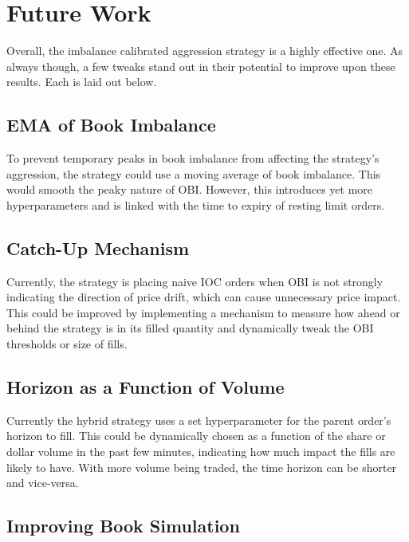 \documentclass[
  letterpaper,
]{article}
\begin{document}
\section{Future Work}\label{sec-future}

Overall, the imbalance calibrated aggression strategy is a highly
effective one. As always though, a few tweaks stand out in their
potential to improve upon these results. Each is laid out below.

\subsection{EMA of Book Imbalance}\label{ema-of-book-imbalance}

To prevent temporary peaks in book imbalance from affecting the
strategy's aggression, the strategy could use a moving average of book
imbalance. This would smooth the peaky nature of OBI. However, this
introduces yet more hyperparameters and is linked with the time to
expiry of resting limit orders.

\subsection{Catch-Up Mechanism}\label{catch-up-mechanism}

Currently, the strategy is placing naive IOC orders when OBI is not
strongly indicating the direction of price drift, which can cause
unnecessary price impact. This could be improved by implementing a
mechanism to measure how ahead or behind the strategy is in its filled
quantity and dynamically tweak the OBI thresholds or size of fills.

\subsection{Horizon as a Function of
Volume}\label{horizon-as-a-function-of-volume}

Currently the hybrid strategy uses a set hyperparameter for the parent
order's horizon to fill. This could be dynamically chosen as a function
of the share or dollar volume in the past few minutes, indicating how
much impact the fills are likely to have. With more volume being traded,
the time horizon can be shorter and vice-versa.

\subsection{Improving Book Simulation}\label{improving-book-simulation}
\end{document}

